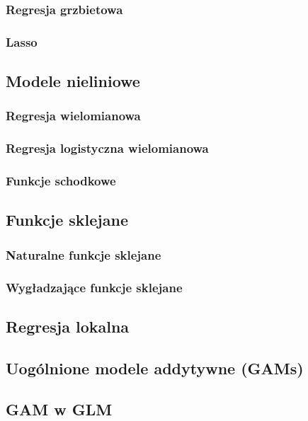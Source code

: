 \documentclass{article}
\begin{document}
\subsubsection{Regresja grzbietowa}
\subsubsection{Lasso}
\subsection{Modele nieliniowe}
\subsubsection{Regresja wielomianowa}
\subsubsection{Regresja logistyczna wielomianowa}
\subsubsection{Funkcje schodkowe}
\subsection{Funkcje sklejane}
\subsubsection{Naturalne funkcje sklejane}
\subsubsection{Wygładzające funkcje sklejane}
\subsection{Regresja lokalna}
\subsection{Uogólnione modele addytywne (GAMs)}
\subsection{GAM w GLM}
\end{document}
